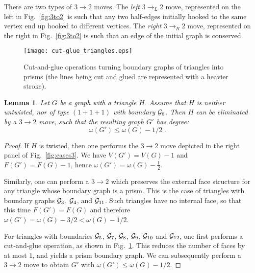\documentclass[10pt]{article}
\theoremstyle{plain}
\newtheorem{lemma}{Lemma}
\theoremstyle{definition}
\newcommand{\cG}{{\cal G}}
\newcommand{\be}{\begin{equation}}
\newcommand{\ee}{\end{equation}}
\begin{document}
 There are two types of $3 \to 2$ moves. The \emph{left} $3 \to_L 2$ move, represented on the left in Fig.~\ref{fig:3to2} is such that 
 any two half-edges initially hooked to the same vertex end up hooked to different vertices. The  \emph{right} $3 \to_R 2$ move, represented on the right in Fig.~\ref{fig:3to2} is such that 
 an edge of the initial graph is conserved.
 
\begin{figure}[htb]
 \begin{center}
 \texttt{[image: cut-glue\_triangles.eps]}  
 \caption{Cut-and-glue operations turning boundary graphs of triangles into prisms (the lines being cut and glued are represented with a heavier stroke).} \label{fig:cut-glue_triangles}
 \end{center}
 \end{figure}
 
 
\begin{lemma}\label{lem:3to2_moves}
Let $G$ be a graph with a triangle $H$. Assume that $H$ is neither untwisted, nor of type $(1+1+1)$ with boundary $\cG_6$. Then $H$ can be eliminated by a $3\to 2$ move, such that the resulting graph $G'$ has degree:
\be
\omega(G') \leq \omega(G) - 1/2\;.
\ee
\end{lemma}
\begin{proof}
If $H$ is twisted, then one performs the $3\to 2$ move depicted in the right panel of Fig.~\ref{fig:cases3}. We have $V(G') = V(G)-1$ and $F(G') = F(G)-1$, hence $\omega(G') = \omega(G) -\frac{1}{2}$.

Similarly, one can perform a $3\to 2$ which preserves the external face structure for any triangle whose boundary graph is a prism. This is the case of triangles with boundary graphs $\cG_3$, $\cG_4$, and $\cG_{11}$.
Such triangles have no internal face, so that this time $F(G')=F(G)$ and therefore $\omega(G') = \omega(G) - 3/2  < \omega(G) - 1/2$.  

For triangles with boundaries $\cG_5$, $\cG_7$, $\cG_8$, $\cG_9$, $\cG_{10}$ and $\cG_{12}$, one first performs a cut-and-glue operation, as shown in Fig.~\ref{fig:cut-glue_triangles}. This reduces 
the number of faces by at most $1$, and yields a prism boundary graph. We can subsequently perform a $3\to2$ move to obtain $G'$ with $\omega(G') \leq \omega(G) - 1/2$.

\end{proof}

\
\end{document}
